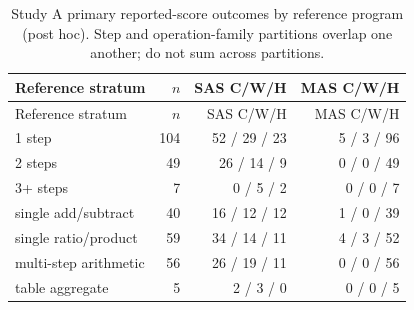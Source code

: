 \begin{longtable}{lrrr}
\caption{Study A primary reported-score outcomes by reference program (post hoc). Step and operation-family partitions overlap one another; do not sum across partitions.}\label{tab:strata}\\
Reference stratum & $n$ & SAS C/W/H & MAS C/W/H\\\toprule\endfirsthead
Reference stratum & $n$ & SAS C/W/H & MAS C/W/H\\\toprule\endhead
1 step & 104 & 52 / 29 / 23 & 5 / 3 / 96\\
2 steps & 49 & 26 / 14 / 9 & 0 / 0 / 49\\
3+ steps & 7 & 0 / 5 / 2 & 0 / 0 / 7\\
single add/subtract & 40 & 16 / 12 / 12 & 1 / 0 / 39\\
single ratio/product & 59 & 34 / 14 / 11 & 4 / 3 / 52\\
multi-step arithmetic & 56 & 26 / 19 / 11 & 0 / 0 / 56\\
table aggregate & 5 & 2 / 3 / 0 & 0 / 0 / 5\\
\bottomrule\end{longtable}